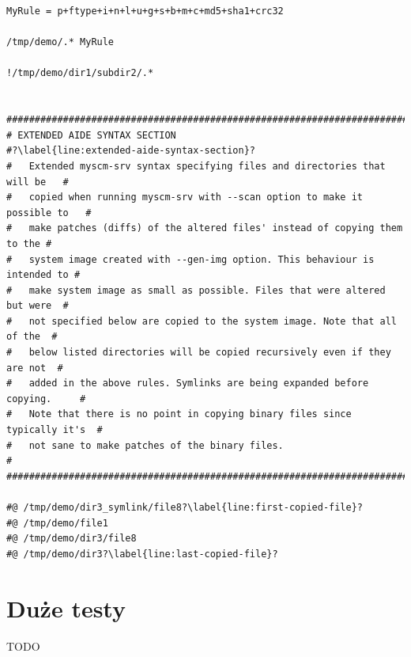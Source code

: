 \documentclass[thesis]{subfiles}
\begin{document}
\begin{lstlisting}
MyRule = p+ftype+i+n+l+u+g+s+b+m+c+md5+sha1+crc32

/tmp/demo/.* MyRule

!/tmp/demo/dir1/subdir2/.*


###############################################################################
# EXTENDED AIDE SYNTAX SECTION                                                #?\label{line:extended-aide-syntax-section}?
#   Extended myscm-srv syntax specifying files and directories that will be   #
#   copied when running myscm-srv with --scan option to make it possible to   #
#   make patches (diffs) of the altered files' instead of copying them to the #
#   system image created with --gen-img option. This behaviour is intended to #
#   make system image as small as possible. Files that were altered but were  #
#   not specified below are copied to the system image. Note that all of the  #
#   below listed directories will be copied recursively even if they are not  #
#   added in the above rules. Symlinks are being expanded before copying.     #
#   Note that there is no point in copying binary files since typically it's  #
#   not sane to make patches of the binary files.                             #
###############################################################################

#@ /tmp/demo/dir3_symlink/file8?\label{line:first-copied-file}?
#@ /tmp/demo/file1
#@ /tmp/demo/dir3/file8
#@ /tmp/demo/dir3?\label{line:last-copied-file}?
\end{lstlisting}
\label{male-testy-plik-konfiguracyjny-last-page} %


\section{Duże testy}
\label{sec:duze-testy}

TODO
\end{document}
